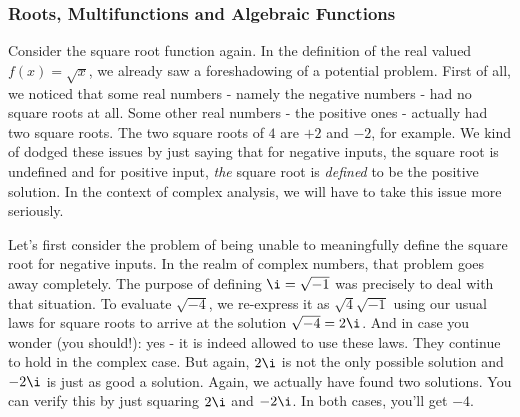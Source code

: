 


\subsubsection{Roots, Multifunctions and Algebraic Functions}
Consider the square root function again. In the definition of the real valued $f(x) = \sqrt{x}$, we already saw a foreshadowing of a potential problem. First of all, we noticed that some real numbers - namely the negative numbers - had no square roots at all. Some other real numbers - the positive ones - actually had two square roots. The two square roots of $4$ are $+2$ and $-2$, for example. We kind of dodged these issues by just saying that for negative inputs, the square root is undefined and for positive input, \emph{the} square root is \emph{defined} to be the positive solution. In the context of complex analysis, we will have to take this issue more seriously. 

\medskip
Let's first consider the problem of being unable to meaningfully define the square root for negative inputs. In the realm of complex numbers, that problem goes away completely. The purpose of defining $\i = \sqrt{-1}$ was precisely to deal with that situation. To evaluate $\sqrt{-4}$, we re-express it as $\sqrt{4} \sqrt{-1}$ using our usual laws for square roots to arrive at the solution $\sqrt{-4} = 2 \i$. And in case you wonder (you should!): yes - it is indeed allowed to use these laws. They continue to hold in the complex case. But again, $2 \i$ is not the only possible solution and $-2 \i$ is just as good a solution. Again, we actually have found two solutions. You can verify this by just squaring $2 \i$ and $-2 \i$. In both cases, you'll get $-4$.

